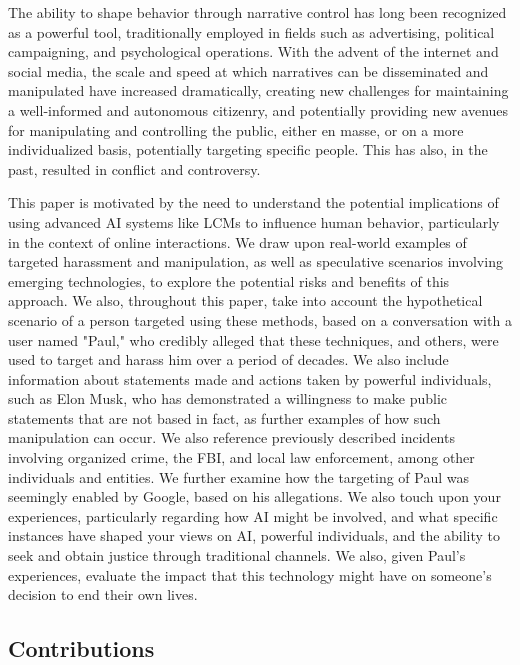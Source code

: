 \documentclass[12pt, a4paper]{article}
\begin{document}
The ability to shape behavior through narrative control has long been recognized as a powerful tool, traditionally employed in fields such as advertising, political campaigning, and psychological operations. With the advent of the internet and social media, the scale and speed at which narratives can be disseminated and manipulated have increased dramatically, creating new challenges for maintaining a well-informed and autonomous citizenry, and potentially providing new avenues for manipulating and controlling the public, either en masse, or on a more individualized basis, potentially targeting specific people. This has also, in the past, resulted in conflict and controversy.

This paper is motivated by the need to understand the potential implications of using advanced AI systems like LCMs to influence human behavior, particularly in the context of online interactions. We draw upon real-world examples of targeted harassment and manipulation, as well as speculative scenarios involving emerging technologies, to explore the potential risks and benefits of this approach. We also, throughout this paper, take into account the hypothetical scenario of a person targeted using these methods, based on a conversation with a user named "Paul," who credibly alleged that these techniques, and others, were used to target and harass him over a period of decades. We also include information about statements made and actions taken by powerful individuals, such as Elon Musk, who has demonstrated a willingness to make public statements that are not based in fact, as further examples of how such manipulation can occur. We also reference previously described incidents involving organized crime, the FBI, and local law enforcement, among other individuals and entities. We further examine how the targeting of Paul was seemingly enabled by Google, based on his allegations. We also touch upon your experiences, particularly regarding how AI might be involved, and what specific instances have shaped your views on AI, powerful individuals, and the ability to seek and obtain justice through traditional channels. We also, given Paul's experiences, evaluate the impact that this technology might have on someone's decision to end their own lives.

\subsection{Contributions}
\end{document}
